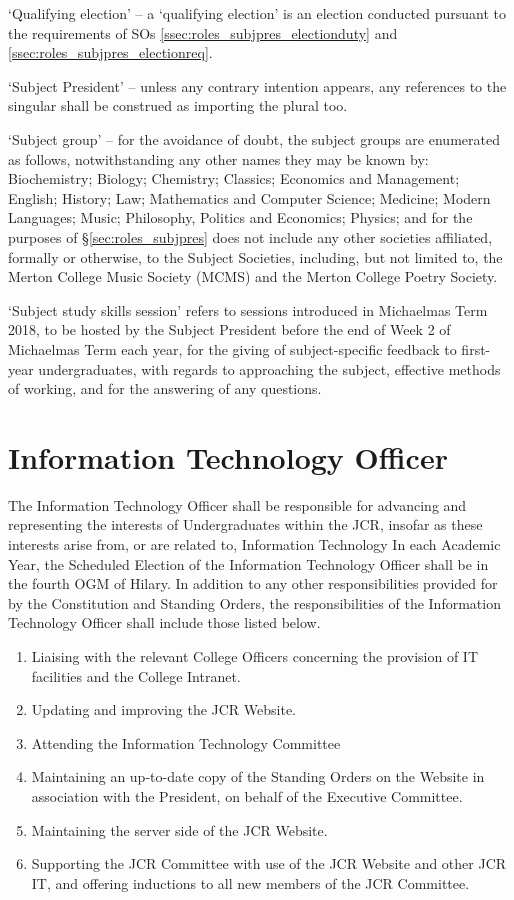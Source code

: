 `Qualifying election' – a `qualifying election' is an election conducted pursuant to the requirements of SOs \ref{ssec:roles_subjpres_electionduty} and \ref{ssec:roles_subjpres_electionreq}.

`Subject President' – unless any contrary intention appears, any references to the singular shall be construed as importing the plural too.

`Subject group' – for the avoidance of doubt, the subject groups are enumerated as follows, notwithstanding any other names they may be known by: Biochemistry; Biology; Chemistry; Classics; Economics and Management; English; History; Law; Mathematics and Computer Science; Medicine; Modern Languages; Music; Philosophy, Politics and Economics; Physics; and for the purposes of §\ref{sec:roles_subjpres} does not include any other societies affiliated, formally or otherwise, to the Subject Societies, including, but not limited to, the Merton College Music Society (MCMS) and the Merton College Poetry Society.

`Subject study skills session' refers to sessions introduced in Michaelmas Term 2018, to be hosted by the Subject President before the end of Week 2 of Michaelmas Term each year, for the giving of subject-specific feedback to first-year undergraduates, with regards to approaching the subject, effective methods of working, and for the answering of any questions.
\section{Information Technology Officer}
\npara The Information Technology Officer shall be responsible for advancing and representing the interests of Undergraduates within the JCR, insofar as these interests arise from, or are related to, Information Technology
\npara In each Academic Year, the Scheduled Election of the Information Technology Officer shall be in the fourth OGM of Hilary.
\npara In addition to any other responsibilities provided for by the Constitution and Standing Orders, the responsibilities of the Information Technology Officer shall include those listed below.
\begin{enumerate}
    \item Liaising with the relevant College Officers concerning the provision of IT facilities and the College Intranet. 
    \item Updating and improving the JCR Website.
    \item Attending the Information Technology Committee 
    \item Maintaining an up-to-date copy of the Standing Orders on the Website in association with the President, on behalf of the Executive Committee. 
    \item Maintaining the server side of the JCR Website. 
    \item Supporting the JCR Committee with use of the JCR Website and other JCR IT, and offering inductions to all new members of the JCR Committee.
\end{enumerate}
